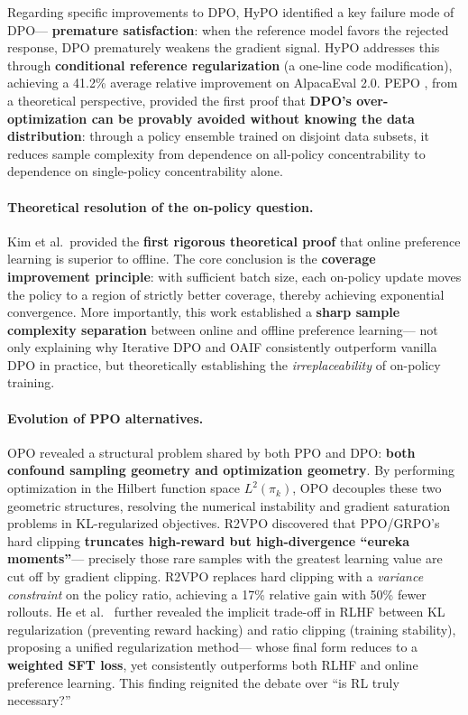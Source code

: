Regarding specific improvements to DPO,
HyPO \cite{hypo2026} identified a key failure mode of DPO---
\textbf{premature satisfaction}:
when the reference model favors the rejected response,
DPO prematurely weakens the gradient signal.
HyPO addresses this through \textbf{conditional reference regularization} (a one-line code modification),
achieving a 41.2\% average relative improvement on AlpacaEval 2.0.
PEPO \cite{barla2026pepo}, from a theoretical perspective,
provided the first proof that
\textbf{DPO's over-optimization can be provably avoided without knowing the data distribution}:
through a policy ensemble trained on disjoint data subsets,
it reduces sample complexity from dependence on all-policy concentrability
to dependence on single-policy concentrability alone.

\paragraph{Theoretical resolution of the on-policy question.}
 Kim et al.\ provided the
\textbf{first rigorous theoretical proof} that online preference learning is superior to offline.
The core conclusion is the \textbf{coverage improvement principle}:
with sufficient batch size,
each on-policy update moves the policy to a region of strictly better coverage,
thereby achieving exponential convergence.
More importantly, this work established a
\textbf{sharp sample complexity separation} between online and offline preference learning---
not only explaining why Iterative DPO and OAIF
consistently outperform vanilla DPO in practice,
but theoretically establishing the \emph{irreplaceability} of on-policy training.

\paragraph{Evolution of PPO alternatives.}
OPO \cite{wang2026opo} revealed a structural problem shared by both PPO and DPO:
\textbf{both confound sampling geometry and optimization geometry}.
By performing optimization in the Hilbert function space $L^2(\pi_k)$,
OPO decouples these two geometric structures,
resolving the numerical instability and gradient saturation problems in KL-regularized objectives.
R2VPO \cite{luo2026r2vpo} discovered that
PPO/GRPO's hard clipping \textbf{truncates high-reward but high-divergence ``eureka moments''}---
precisely those rare samples with the greatest learning value are cut off by gradient clipping.
R2VPO replaces hard clipping with a \emph{variance constraint} on the policy ratio,
achieving a 17\% relative gain with 50\% fewer rollouts.
He et al.\ \cite{he2026unifiedrlhf}
further revealed the implicit trade-off in RLHF between KL regularization (preventing reward hacking)
and ratio clipping (training stability),
proposing a unified regularization method---
whose final form reduces to a \textbf{weighted SFT loss},
yet consistently outperforms both RLHF and online preference learning.
This finding reignited the debate over ``is RL truly necessary?''

